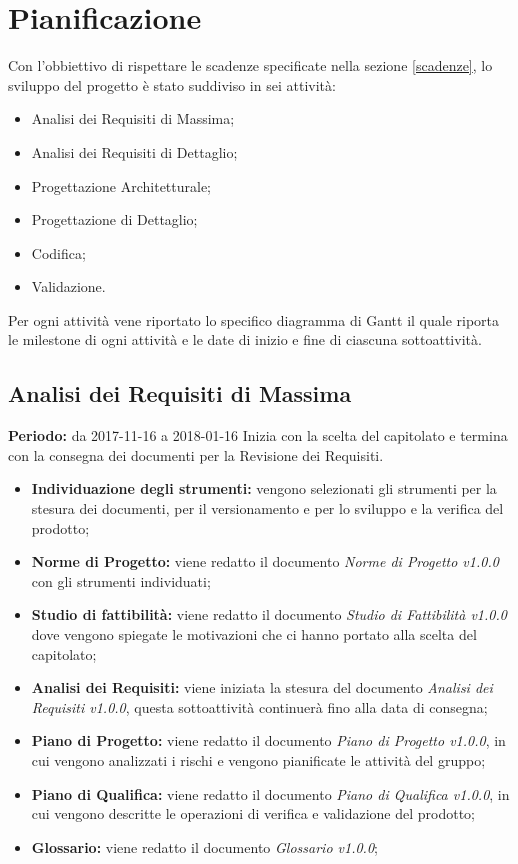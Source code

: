 \section{Pianificazione}
 
Con l'obbiettivo di rispettare le scadenze specificate nella sezione \ref{scadenze}, lo sviluppo del progetto è stato suddiviso in sei attività:
 
\begin{itemize}
 
	\item Analisi dei Requisiti di Massima;
 
	\item Analisi dei Requisiti di Dettaglio;
 
	\item Progettazione Architetturale;
 
	\item Progettazione di Dettaglio;
 
	\item Codifica;
 
	\item Validazione.
 
\end{itemize}
 
Per ogni attività vene riportato lo specifico diagramma di Gantt il quale riporta le milestone di ogni attività e le date di inizio e fine di ciascuna sottoattività.
 

\subsection{Analisi dei Requisiti di Massima}
\textbf{Periodo:} da 2017-11-16 a 2018-01-16\Spazio
Inizia con la scelta del capitolato e termina con la consegna dei documenti per la Revisione dei Requisiti.
\begin{itemize}
	\item \textbf{Individuazione degli strumenti:} vengono selezionati gli strumenti per la stesura dei documenti, per il versionamento e per lo sviluppo e la verifica del prodotto;
	\item \textbf{Norme di Progetto:} viene redatto il documento \emph{Norme di Progetto v1.0.0} con gli strumenti individuati;  
	\item \textbf{Studio di fattibilità:} viene redatto il documento \emph{Studio di Fattibilità v1.0.0} dove vengono spiegate le motivazioni che ci hanno portato alla scelta del capitolato;
	\item \textbf{Analisi dei Requisiti:} viene iniziata la stesura del documento \emph{Analisi dei Requisiti v1.0.0}, questa sottoattività continuerà fino alla data di consegna;
	\item \textbf{Piano di Progetto:} viene redatto il documento \emph{Piano di Progetto v1.0.0}, in cui vengono analizzati i rischi e vengono pianificate le attività del gruppo; 
	\item \textbf{Piano di Qualifica:} viene redatto il documento \emph{Piano di Qualifica v1.0.0}, in cui vengono descritte le operazioni di verifica e validazione del prodotto;
	\item \textbf{Glossario:} viene redatto il documento \emph{Glossario v1.0.0};
\end{itemize}
